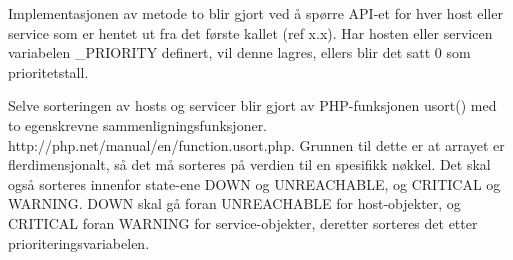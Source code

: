Implementasjonen av metode to blir gjort ved å spørre API-et for hver host eller service som er hentet ut fra det første kallet (ref x.x). Har hosten eller servicen variabelen \_PRIORITY definert, vil denne lagres, ellers blir det satt 0 som prioritetstall.

Selve sorteringen av hosts og servicer blir gjort av PHP-funksjonen usort() med to egenskrevne sammenligningsfunksjoner. http://php.net/manual/en/function.usort.php. Grunnen til dette er at arrayet er flerdimensjonalt, så det må sorteres på verdien til en spesifikk nøkkel. Det skal også sorteres innenfor state-ene DOWN og UNREACHABLE, og CRITICAL og WARNING. DOWN skal gå foran UNREACHABLE for host-objekter, og CRITICAL foran WARNING for service-objekter, deretter sorteres det etter prioriteringsvariabelen.
